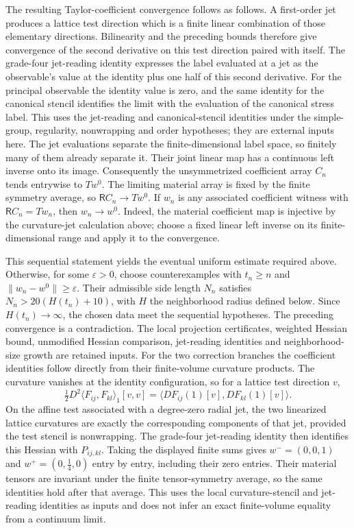 The resulting Taylor-coefficient convergence follows as follows. A
first-order jet produces a lattice test direction which is a finite linear
combination of those elementary directions. Bilinearity and the preceding
bounds therefore give convergence of the second derivative on this test
direction paired with itself. The grade-four jet-reading identity expresses
the label evaluated at a jet as the observable's value at the identity
plus one half of this second derivative. For the principal observable the
identity value is zero, and the same identity for the canonical stencil
identifies the limit with the evaluation of the canonical stress label.
This uses the jet-reading and canonical-stencil identities under the
simple-group, regularity, nonwrapping and order hypotheses; they are
external inputs here. The jet evaluations separate the finite-dimensional
label space, so finitely many of them already separate it. Their joint
linear map has a continuous left inverse onto its image. Consequently the
unsymmetrized coefficient array $C_n$ tends entrywise to $T w^0$.
The limiting material array is fixed by the finite symmetry average, so
$\mathsf R C_n\to T w^0$. If $w_n$ is any associated coefficient witness
with $\mathsf R C_n=T w_n$, then $w_n\to w^0$. Indeed, the material coefficient map is injective by the curvature-jet
calculation above; choose a fixed linear left inverse on its finite-dimensional
range and apply it to the convergence.

This sequential statement yields the eventual uniform estimate required
above. Otherwise, for some $\varepsilon>0$, choose counterexamples with
$t_n\ge n$ and $\|w_n-w^0\|\ge\varepsilon$. Their admissible side length
$N_n$ satisfies $N_n>20(H(t_n)+10)$, with $H$ the neighborhood radius
defined below. Since $H(t_n)\to\infty$, the chosen data meet the sequential
hypotheses. The preceding convergence is a contradiction.
The local projection certificates, weighted Hessian bound, unmodified
Hessian comparison, jet-reading identities and neighborhood-size growth
are retained inputs. For the two correction branches the coefficient
identities follow directly from their finite-volume curvature products. The curvature
vanishes at the identity configuration, so for a lattice test direction
$v$,
\[
 \tfrac12D^2\langle F_{ij},F_{kl}\rangle_{1}[v,v]
 =\langle DF_{ij}(1)[v],DF_{kl}(1)[v]\rangle.
\]
On the affine test associated with a degree-zero radial jet, the two
linearized lattice curvatures are exactly the corresponding components of
that jet, provided the test stencil is nonwrapping. The grade-four
jet-reading identity then identifies this Hessian with $P_{ij,kl}$.
Taking the displayed finite sums gives $w^-=(0,0,1)$ and
$w^+=(0,\tfrac14,0)$ entry by entry, including their zero entries. Their
material tensors are invariant under the finite tensor-symmetry average,
so the same identities hold after that average. This uses the local
curvature-stencil and jet-reading identities as inputs and does not infer
an exact finite-volume equality from a continuum limit.

